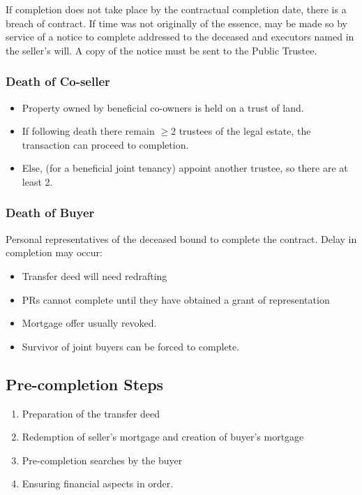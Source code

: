 \documentclass[
]{article}
\providecommand{\tightlist}{%
  \setlength{\itemsep}{0pt}\setlength{\parskip}{0pt}}
\begin{document}
If completion does not take place by the contractual completion date,
there is a breach of contract. If time was not originally of the
essence, may be made so by service of a notice to complete addressed to
the deceased and executors named in the seller's will. A copy of the
notice must be sent to the Public Trustee.

\hypertarget{death-of-co-seller}{%
\subsubsection{Death of Co-seller}\label{death-of-co-seller}}

\begin{itemize}
\tightlist
\item
  Property owned by beneficial co-owners is held on a trust of land.
\item
  If following death there remain {\(\geq 2\)} trustees of the legal
  estate, the transaction can proceed to completion.
\item
  Else, (for a beneficial joint tenancy) appoint another trustee, so
  there are at least 2.
\end{itemize}

\hypertarget{death-of-buyer}{%
\subsubsection{Death of Buyer}\label{death-of-buyer}}

Personal representatives of the deceased bound to complete the contract.
Delay in completion may occur:

\begin{itemize}
\tightlist
\item
  Transfer deed will need redrafting
\item
  PRs cannot complete until they have obtained a grant of representation
\item
  Mortgage offer usually revoked.
\item
  Survivor of joint buyers can be forced to complete.
\end{itemize}

\hypertarget{pre-completion-steps}{%
\subsection{Pre-completion Steps}\label{pre-completion-steps}}

\begin{enumerate}
\tightlist
\item
  Preparation of the transfer deed
\item
  Redemption of seller's mortgage and creation of buyer's mortgage
\item
  Pre-completion searches by the buyer
\item
  Ensuring financial aspects in order.
\end{enumerate}
\end{document}
